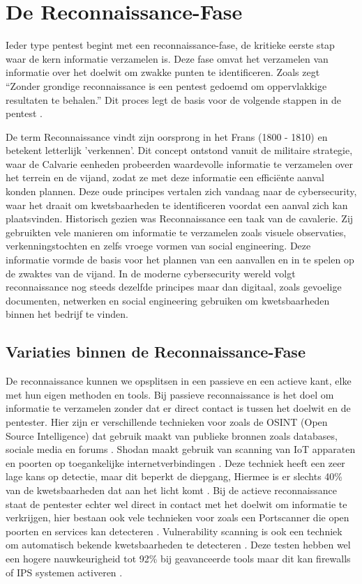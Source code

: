 \section{De Reconnaissance-Fase}
Ieder type pentest begint met een reconnaissance-fase, de kritieke eerste stap waar de kern informatie verzamelen is. 
Deze fase omvat het verzamelen van informatie over het doelwit om zwakke punten te identificeren. 
Zoals \textcite{Shah} zegt ``Zonder grondige reconnaissance is een pentest gedoemd om oppervlakkige resultaten te behalen.''
Dit proces legt de basis voor de volgende stappen in de pentest \autocite{Kothia}.

De term Reconnaissance vindt zijn oorsprong in het Frans (1800 - 1810) en betekent letterlijk 'verkennen'. 
Dit concept ontstond vanuit de militaire strategie, waar de Calvarie eenheden probeerden waardevolle informatie te verzamelen over het terrein en de vijand, zodat ze met deze informatie een efficiënte aanval konden plannen.
Deze oude principes vertalen zich vandaag naar de cybersecurity, waar het draait om kwetsbaarheden te identificeren voordat een aanval zich kan plaatsvinden.
Historisch gezien was Reconnaissance een taak van de cavalerie. Zij gebruikten vele manieren om informatie te verzamelen zoals visuele observaties, verkenningstochten en zelfs vroege vormen van social engineering. 
Deze informatie vormde de basis voor het plannen van een aanvallen en in te spelen op de zwaktes van de vijand.
In de moderne cybersecurity wereld volgt reconnaissance nog steeds dezelfde principes maar dan digitaal, zoals gevoelige documenten, netwerken en social engineering gebruiken om kwetsbaarheden binnen het bedrijf te vinden.

\subsection{Variaties binnen de Reconnaissance-Fase}
De reconnaissance kunnen we opsplitsen in een passieve en een actieve kant, elke met hun eigen methoden en tools. 
Bij passieve reconnaissance is het doel om informatie te verzamelen zonder dat er direct contact is tussen het doelwit en de pentester.
Hier zijn er verschillende technieken voor zoals de OSINT (Open Source Intelligence) dat gebruik maakt van publieke bronnen zoals databases, sociale media en forums \autocite{Dalalana2017}. 
Shodan maakt gebruik van scanning van IoT apparaten en poorten op toegankelijke internetverbindingen \autocite{Monero2025}.
Deze techniek heeft een zeer lage kans op detectie, maar dit beperkt de diepgang, Hiermee is er slechts 40\% van de kwetsbaarheden dat aan het licht komt \parencite{Mahin2014}.
Bij de actieve reconnaissance staat de pentester echter wel direct in contact met het doelwit om informatie te verkrijgen, hier bestaan ook vele technieken voor zoals een Portscanner die open poorten en services kan detecteren \autocite{Monero2025}. 
Vulnerability scanning is ook een techniek om automatisch bekende kwetsbaarheden te detecteren \autocite{GOEL2015}. 
Deze testen hebben wel een hogere nauwkeurigheid tot 92\% bij geavanceerde tools maar dit kan firewalls of IPS systemen activeren \parencite{Li2022}.

